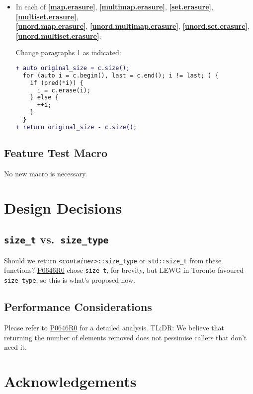 \documentclass[11pt]{article}
\newcommand{\wgpaper}[1]{\href{https://wg21.link/#1}{#1}}
\newcommand{\isref}[1]{\textbf{[\wgpaper{#1}]}}
\newcommand{\cst}{\texttt{\textit{<container>}::size\_type}}
\begin{document}
\begin{itemize}
\item In each of  \isref{map.erasure},
  \isref{multimap.erasure}, \isref{set.erasure},
  \isref{multiset.erasure},\\ \isref{unord.map.erasure},
  \isref{unord.multi\-map.erasure}, \isref{unord.set.erasure},\\
  \isref{unord.multiset.erasure}:
  
  Change paragraphs 1 as indicated:

\begin{lstlisting}[language=diff]
+ auto original_size = c.size();
  for (auto i = c.begin(), last = c.end(); i != last; ) {
    if (pred(*i)) {
      i = c.erase(i);
    } else {
      ++i;
    }
  }
+ return original_size - c.size();
\end{lstlisting}

\end{itemize}

\subsection{Feature Test Macro}

No new macro is necessary.

\section{Design Decisions}

\subsection{\texttt{size\_t} vs.\ \texttt{size\_type}}

Should we return \cst{} or \texttt{std::size\_t} from these functions?
\wgpaper{P0646R0} chose \texttt{size\_t}, for brevity, but LEWG in
Toronto favoured \texttt{size\_type}, so this is what's proposed now.

\subsection{Performance Considerations}

Please refer to \wgpaper{P0646R0} for a detailed analysis. TL;DR: We
believe that returning the number of elements removed does not pessimise
callers that don't need it.

\section{Acknowledgements}
\end{document}
